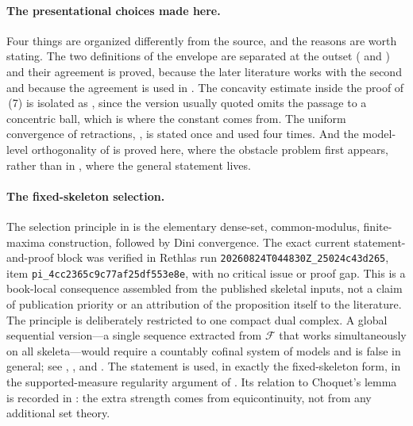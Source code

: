 \paragraph{The presentational choices made here.}
Four things are organized differently from the source, and the reasons are
worth stating.  The two definitions of the envelope are separated at the
outset ( and ) and
their agreement is proved, because the later literature works with the
second and because the agreement is used in
.  The concavity estimate inside the proof of
\,(7) is isolated as
, since the version usually quoted omits
the passage to a concentric ball, which is where the constant comes from.
The uniform convergence of retractions,
, is stated once and used four times.  And
the model-level orthogonality of
 is proved here, where the obstacle
problem first appears, rather than in
, where the general statement lives.

\paragraph{The fixed-skeleton selection.}
The selection principle in  is the
elementary dense-set, common-modulus, finite-maxima construction, followed
by Dini convergence.  The exact current statement-and-proof block was
verified in Rethlas run
\nolinkurl{20260824T044830Z_25024c43d265}, item
\nolinkurl{pi_4cc2365c9c77af25df553e8e}, with no critical issue or proof gap.
This is a book-local consequence assembled from the published skeletal
inputs, not a claim of publication priority or an attribution of the
proposition itself to the literature.  The
principle is deliberately restricted to one compact dual complex.  A global
sequential version---a
single sequence extracted from \(\mathcal F\) that works simultaneously on
all skeleta---would require a countably cofinal system of models and is
false in general; see ,
, and .  The
statement is used, in exactly the fixed-skeleton form, in the
supported-measure regularity argument of
.  Its relation to Choquet's lemma is
recorded in : the extra strength comes
from equicontinuity, not from any additional set theory.

